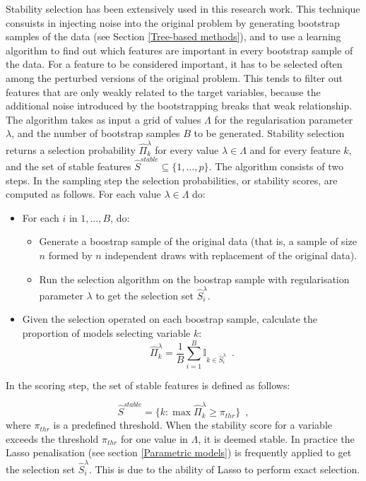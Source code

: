 Stability selection \citep{meinshausen2010stability} has been extensively used in this research work. This technique consuists in injecting noise into the original problem by generating bootstrap samples of the data (see Section \ref{Tree-based methods}), and to use a learning algorithm to find out which features are important in every bootstrap sample of the data. For a feature to be considered important, it has to be selected often among the perturbed versions of the original problem. This tends to filter out features that are only weakly related to the target variables, because the additional noise introduced by the bootstrapping breaks that weak relationship. The algorithm takes as input a grid of values $\Lambda$ for the regularisation parameter $\lambda$, and the number of bootstrap samples $B$ to be generated. Stability selection returns a selection probability $\hat{\Pi}^{\lambda}_{k}$ for every value $\lambda \in \Lambda$ and for every feature $k$, and the set of stable features $\hat{S}^{stable}\subseteq\{1,\ldots,p\}$. The algorithm consists of two steps. In the sampling step the selection probabilities, or stability scores, are computed as follows. For each value $\lambda \in \Lambda$ do:

\begin{itemize}
    \item For each $i$ in $1,\dots, B$, do:
    \begin{itemize}
        \item Generate a boostrap sample of the original data (that is, a sample of size $n$ formed by $n$ independent draws with replacement of the original data).
        \item Run the selection algorithm on the boostrap sample with regularisation parameter $\lambda$ to get the selection set $\hat{S}^{\lambda}_{i}$.
    \end{itemize}
    \item Given the selection operated on each boostrap sample, calculate the proportion of models selecting variable $k$:
    \begin{equation*}
        \hat{\Pi}^{\lambda}_{k} = \frac{1}{B}\sum_{i=1}^{B} \mathds{I}_{k \in \hat{S}^{\lambda}_{i}}
        \enspace.
    \end{equation*}
\end{itemize}
%
In the scoring step, the set of stable features is defined as follows:

\begin{equation*}
    \hat{S}^{stable} = \{k:\max\hat{\Pi}^{\lambda}_{k} \geq \pi_{thr}\}
    \enspace,
\end{equation*}
%
where $\pi_{thr}$ is a predefined threshold. When the stability score for a variable exceeds the threshold $\pi_{thr}$ for one value in $\Lambda$, it is deemed stable. In practice the Lasso penalisation (see section \ref{Parametric models}) is frequently applied to get the selection set $\hat{S}^{\lambda}_{i}$. This is due to the ability of Lasso to perform exact selection.


